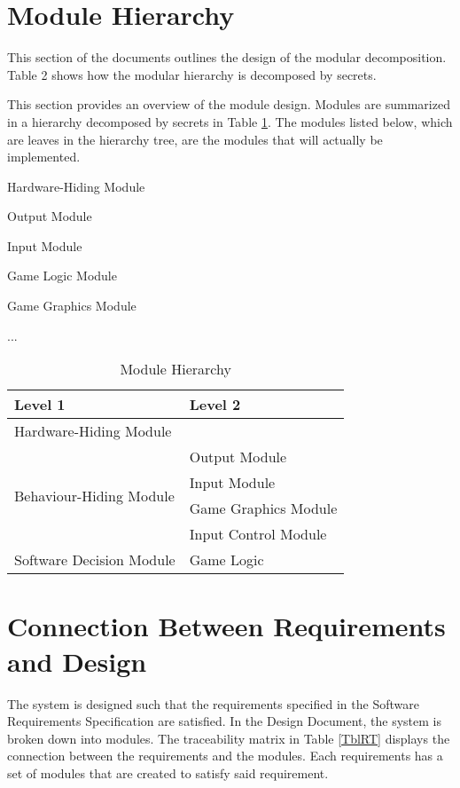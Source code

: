 \documentclass[12pt, titlepage]{article}
\newcounter{mnum}
\newcommand{\mthemnum}{M\themnum}
\begin{document}
\section{Module Hierarchy} \label{SecMH}
	This section of the documents outlines the design of the modular decomposition. Table 2 shows how the modular hierarchy is decomposed by secrets.

This section provides an overview of the module design. Modules are summarized
in a hierarchy decomposed by secrets in Table \ref{TblMH}. The modules listed
below, which are leaves in the hierarchy tree, are the modules that will
actually be implemented.
\begin{description}
\item [ \mthemnum \label{mHH}:] Hardware-Hiding Module
\item [ \mthemnum \label{mHH}:] Output Module
\item [ \mthemnum \label{mHH}:] Input Module
\item [ \mthemnum \label{mHH}:] Game Logic Module
\item [ \mthemnum \label{mHH}:] Game Graphics Module

\item ...
\end{description}
\begin{table}[h!]
\centering
\begin{tabular}{p{} p{}}
\toprule
\textbf{Level 1} & \textbf{Level 2}\\
\midrule
{Hardware-Hiding Module} & ~ \\
\midrule
\multirow{4}{0.3\textwidth}{Behaviour-Hiding Module} & Output Module\\
& Input Module\\
& Game Graphics Module\\
& Input Control Module\\
\midrule
\multirow{1}{0.3\textwidth}{Software Decision Module} &  Game Logic\\

\bottomrule
\end{tabular}
\caption{Module Hierarchy}
\label{TblMH}
\end{table}


\section{Connection Between Requirements and Design} \label{SecConnection}
	The system is designed such that the requirements specified in the Software Requirements Specification are satisfied. In the Design Document, the system is broken down into modules. The traceability matrix in Table \ref{TblRT} displays the connection between the requirements and the modules. Each requirements has a set of modules that are created to satisfy said requirement.
\end{document}
